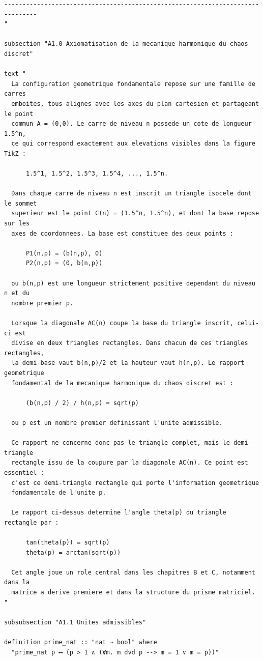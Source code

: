 \documentclass[12pt,a4paper]{article}
\theoremstyle{definition}
\theoremstyle{remark}
\begin{document}
\begin{verbatim}
-------------------------------------------------------------------------------
"

subsection "A1.0 Axiomatisation de la mecanique harmonique du chaos discret"

text "
  La configuration geometrique fondamentale repose sur une famille de carres
  emboites, tous alignes avec les axes du plan cartesien et partageant le point
  commun A = (0,0). Le carre de niveau n possede un cote de longueur 1.5^n,
  ce qui correspond exactement aux elevations visibles dans la figure TikZ :

      1.5^1, 1.5^2, 1.5^3, 1.5^4, ..., 1.5^n.

  Dans chaque carre de niveau n est inscrit un triangle isocele dont le sommet
  superieur est le point C(n) = (1.5^n, 1.5^n), et dont la base repose sur les
  axes de coordonnees. La base est constituee des deux points :

      P1(n,p) = (b(n,p), 0)
      P2(n,p) = (0, b(n,p))

  ou b(n,p) est une longueur strictement positive dependant du niveau n et du
  nombre premier p.

  Lorsque la diagonale AC(n) coupe la base du triangle inscrit, celui-ci est
  divise en deux triangles rectangles. Dans chacun de ces triangles rectangles,
  la demi-base vaut b(n,p)/2 et la hauteur vaut h(n,p). Le rapport geometrique
  fondamental de la mecanique harmonique du chaos discret est :

      (b(n,p) / 2) / h(n,p) = sqrt(p)

  ou p est un nombre premier definissant l'unite admissible.

  Ce rapport ne concerne donc pas le triangle complet, mais le demi-triangle
  rectangle issu de la coupure par la diagonale AC(n). Ce point est essentiel :
  c'est ce demi-triangle rectangle qui porte l'information geometrique
  fondamentale de l'unite p.

  Le rapport ci-dessus determine l'angle theta(p) du triangle rectangle par :

      tan(theta(p)) = sqrt(p)
      theta(p) = arctan(sqrt(p))

  Cet angle joue un role central dans les chapitres B et C, notamment dans la
  matrice a derive premiere et dans la structure du prisme matriciel.
"

subsubsection "A1.1 Unites admissibles"

definition prime_nat :: "nat ⇒ bool" where
  "prime_nat p ⟷ (p > 1 ∧ (∀m. m dvd p --> m = 1 ∨ m = p))"


\end{verbatim}
\end{document}
